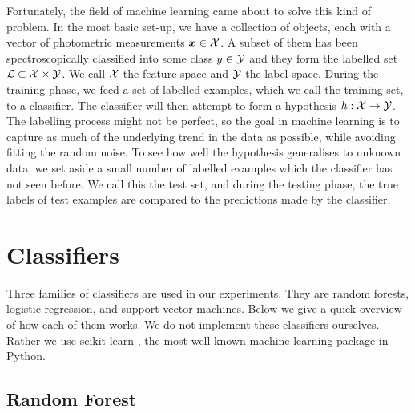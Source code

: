 Fortunately, the field of machine learning came about to solve this kind of problem. In the most
basic set-up, we have a collection of objects, each with a vector of photometric measurements $\bm{x} \in
\mathcal{X}$. A subset of them has been spectroscopically classified into some class $y \in \mathcal{Y}$ and they
form the labelled set $\mathcal{L} \subset \mathcal{X} \times \mathcal{Y}$. We call $\mathcal{X}$ the feature space and $\mathcal{Y}$ the
label space. During the training phase, we feed a set of labelled examples, which we call the
training set, to a classifier. The classifier will then attempt to form a hypothesis $h: \mathcal{X}
\rightarrow \mathcal{Y}$. The labelling process might not be perfect, so the goal in machine learning is to
capture as much of the underlying trend in the data as possible, while avoiding fitting the random
noise. To see how well the hypothesis generalises to unknown data, we set aside a small number of
labelled examples which the classifier has not seen before. We call this the test set, and during
the testing phase, the true labels of test examples are compared to the predictions made by the
classifier.


\section{Classifiers}
\label{sec:classifiers}

Three families of classifiers are used in our experiments. They are random forests, logistic
regression, and support vector machines. Below we give a quick overview of how each of them works.
We do not implement these classifiers ourselves. Rather we use scikit-learn \cite{pedregosa11}, the
most well-known machine learning package in Python.

\subsection{Random Forest}
\label{sub:forest}

